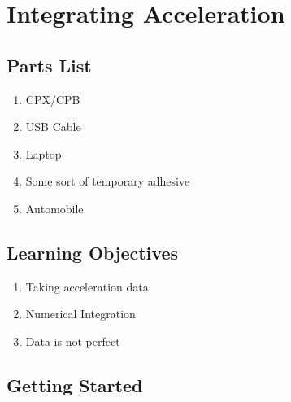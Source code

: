 \newpage

\section{Integrating Acceleration}

\subsection{Parts List}

\begin{enumerate}[itemsep=-5pt]
\item CPX/CPB
\item USB Cable
\item Laptop
\item Some sort of temporary adhesive
\item Automobile
\end{enumerate}

\subsection{Learning Objectives}
\begin{enumerate}[itemsep=-5pt]
\item Taking acceleration data
\item Numerical Integration 
\item Data is not perfect
\end{enumerate}

\subsection{Getting Started}

